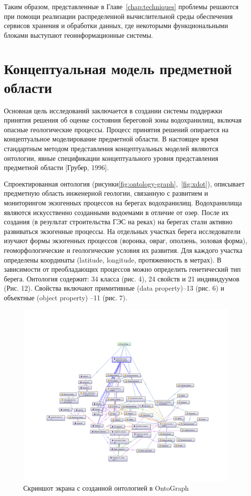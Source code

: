 \documentclass[732,14pt,final]{studrep}
\begin{document}
Таким образом, представленные в Главе~\ref{chap:techniques} проблемы решаются при помощи реализации распределенной вычислительной среды обеспечения сервисов хранения и обработки данных, где некоторыми функциональными блоками выступают геоинформационные системы.

\section{Концептуальная модель предметной области}

Основная цель исследований заключается в создании системы поддержки принятия решения об оценке состояния береговой зоны водохранилищ, включая опасные геологические процессы. Процесс принятия решений опирается на концептуальное моделирование предметной области. В настоящее время стандартным методом представления концептуальных моделей являются онтологии, явные спецификации концептуального уровня представления предметной области [Грубер, 1996].

Спроектированная онтология (рисунки\ref{fig:ontology-graph},~\ref{fig:xdot}), описывает предметную область инженерной геологии, связанную с развитием и мониторингом экзогенных процессов на берегах водохранилищ. Водохранилища являются искусственно созданными водоемами в отличие от озер. После их создания (в результат строительства ГЭС на реках) на берегах стали активно развиваться экзогенные процессы. На отдельных участках берега исследователи изучают формы экзогенных процессов (воронка, овраг, оползень, эоловая форма), геоморфологические и геологические условия их развития. Для каждого участка определены координаты (latitude, longitude, протяженность в метрах). В зависимости от преобладающих процессов можно определить генетический тип берега. Онтология содержит: 34 класса (рис. 4), 24 свойств и 21 индивидуумов (Рис. 12). Свойства включают примитивные (data property)–13 (рис. 6) и объектные (object property) –11 (рис. 7).

\begin{center}
  \begin{figure}[htp]
	\centering
	\includegraphics[width=0.7\linewidth]{pics/image6.png}
    \caption{Скриншот экрана с созданной онтологией в OntoGraph}
    \label{fig:}
  \end{figure}
\end{center}
\end{document}
